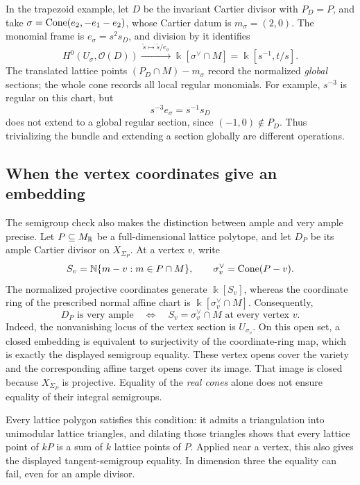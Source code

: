 \begin{observation}
In the trapezoid example, let \(D\) be the invariant Cartier divisor
with \(P_D=P\), and take
\(\sigma=\operatorname{Cone}(e_2,-e_1-e_2)\), whose Cartier datum is
\(m_\sigma=(2,0)\). The monomial frame is
\label{obs:classroom-oct19-local-global}
\(e_\sigma=s^2s_D\), and division by it identifies
\[
H^0(U_\sigma,\mathcal O(D))
\xrightarrow{\ \widetilde s\mapsto\widetilde s/e_\sigma\ }
\Bbbk[\sigma^\vee\cap M]
=\Bbbk[s^{-1},t/s].
\]
The translated lattice points \((P_D\cap M)-m_\sigma\) record the
normalized \emph{global} sections; the whole cone records all local
regular monomials. For example, \(s^{-3}\) is regular on this chart,
but
\[
s^{-3}e_\sigma=s^{-1}s_D
\]
does not extend to a global regular section, since \((-1,0)\notin P_D\).
Thus trivializing the bundle and extending a section globally are
different operations.
\end{observation}

\subsection{When the vertex coordinates give an embedding}

The semigroup check also makes the distinction between ample and very
ample precise. Let \(P\subseteq M_{\mathbb{R}}\) be a full-dimensional lattice
polytope, and let
\(D_P\) be its ample Cartier divisor on \(X_{\Sigma_P}\). At a vertex
\(v\), write
\[
S_v=\mathbb{N}\{m-v:m\in P\cap M\},\qquad
\sigma_v^\vee=\operatorname{Cone}(P-v).
\]
The normalized projective coordinates generate \(\Bbbk[S_v]\), whereas
the coordinate ring of the prescribed normal affine chart is
\(\Bbbk[\sigma_v^\vee\cap M]\). Consequently,
\[
\boxed{
D_P\text{ is very ample}
\quad\Longleftrightarrow\quad
S_v=\sigma_v^\vee\cap M\text{ at every vertex }v.
}
\]
Indeed, the nonvanishing locus of the vertex section is
\(U_{\sigma_v}\). On this open set, a closed embedding is equivalent
to surjectivity of the coordinate-ring map, which is exactly the
displayed semigroup equality. These vertex opens cover the variety
and the corresponding affine target opens cover its image. That
image is closed because \(X_{\Sigma_P}\) is projective.
Equality of the \emph{real cones} alone does not ensure equality of
their integral semigroups.

Every lattice polygon satisfies this condition: it admits a
triangulation into unimodular lattice triangles, and dilating those
triangles shows that every lattice point of \(kP\) is a sum of \(k\)
lattice points of \(P\). Applied near a vertex, this also gives the
displayed tangent-semigroup equality. In dimension three the equality
can fail, even for an ample divisor.

